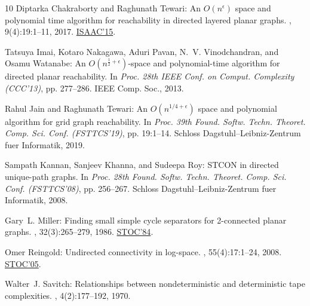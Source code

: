 \documentclass[11pt]{article}
\numberwithin{equation}{section}
\theoremstyle{definition}
\theoremstyle{plain}
\begin{document}
\begin{thebibliography}{10}
{\sc Diptarka Chakraborty and Raghunath Tewari}: An ${O}(n^{\epsilon})$ space
  and polynomial time algorithm for reachability in directed layered planar
  graphs.
, 9(4):19:1--11, 2017.
\newblock \prelim
  \href{https://doi.org/10.1007/978-3-662-48971-0\_52}{ISAAC'15}.

{\sc Tatsuya Imai, Kotaro Nakagawa, Aduri Pavan, N.~V. Vinodchandran, and Osamu
  Watanabe}: An ${O}(n^{\frac{1}{2} + \epsilon})$-space and polynomial-time
  algorithm for directed planar reachability.
\newblock In {\em Proc. 28th IEEE Conf. on Comput. Complexity (CCC'13)}, pp.
  277--286. IEEE Comp. Soc., 2013.

{\sc Rahul Jain and Raghunath Tewari}: An ${O}(n^{1/4 +\epsilon})$ space and
  polynomial algorithm for grid graph reachability.
\newblock In {\em Proc. 39th Found. Softw. Techn. Theoret. Comp. Sci. Conf.
  (FSTTCS'19)}, pp. 19:1--14. Schloss Dagstuhl--Leibniz-Zentrum fuer
  Informatik, 2019.

{\sc Sampath Kannan, Sanjeev Khanna, and Sudeepa Roy}: {STCON} in directed
  unique-path graphs.
\newblock In {\em Proc. 28th Found. Softw. Techn. Theoret. Comp. Sci. Conf.
  (FSTTCS'08)}, pp. 256--267. Schloss Dagstuhl--Leibniz-Zentrum fuer
  Informatik, 2008.

{\sc Gary~L. Miller}: Finding small simple cycle separators for 2-connected
  planar graphs.
, 32(3):265--279, 1986.
\newblock \prelim \href{https://doi.org/10.1145/800057.808703}{STOC'84}.
\newblock [\epfmtdoi{10.1016/0022-0000(86)90030-9}]

{\sc Omer Reingold}: Undirected connectivity in log-space.
, 55(4):17:1--24, 2008.
\newblock \prelim \href{https://doi.org/10.1145/1060590.1060647}{STOC'05}.
\newblock [\epfmtdoi{10.1145/1391289.1391291}]

{\sc Walter~J. Savitch}: Relationships between nondeterministic and
  deterministic tape complexities.
, 4(2):177--192, 1970.
\newblock [\epfmtdoi{10.1016/S0022-0000(70)80006-X}]


\end{thebibliography}
\end{document}
